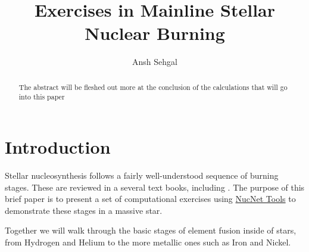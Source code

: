 \documentclass[manuscript]{aastex62}
\begin{document}
\title{Exercises in Mainline Stellar Nuclear Burning}


\author{Ansh Sehgal}

\begin{abstract}
The abstract will be fleshed out more at the conclusion of the calculations that will go into this paper
\end{abstract}

\section{Introduction}

Stellar nucleosynthesis follows a fairly well-understood sequence of burning
stages.  These are reviewed in a several text books, including
\cite{1983psen.book.....C,1996snai.book.....A,2007nps..book.....I}.
The purpose of this brief paper is to present a set of computational
exercises using
\href{http://sourceforge.net/projects/nucnet-tools/}{NucNet Tools}
to demonstrate these stages in a massive star.

Together we will walk through the basic stages of element fusion inside of stars, from Hydrogen and Helium to the more metallic ones such as Iron and Nickel.

%
\end{document}
